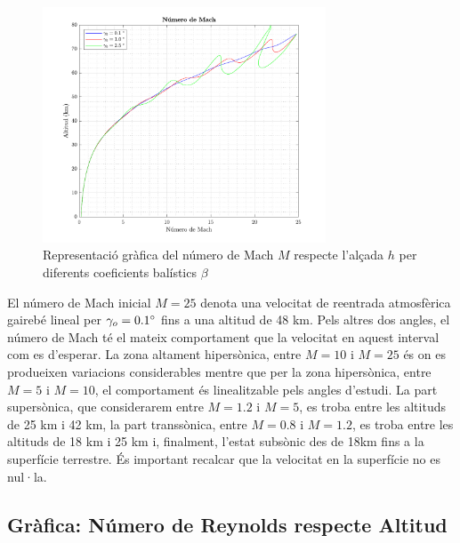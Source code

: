 \begin{figure}[ht]
    \centering
    \includegraphics[width=0.75\textwidth]{imagenes/02_lifting_graficas/mach.pdf}
    \caption{Representació gràfica del número de Mach $M$ respecte l'alçada $h$ per diferents coeficients balístics $\beta$}
    \label{fig:mach_lift}
\end{figure}

El número de Mach inicial $ M = 25$ denota una velocitat de reentrada atmosfèrica gairebé lineal per $\gamma_o = 0.1 \mathrm{^{\circ}} $ fins a una altitud de 48 km. Pels altres dos angles, el número de Mach té el mateix comportament que la velocitat en aquest interval com es d'esperar. La zona altament hipersònica, entre $M = 10$ i $M = 25$ és on es produeixen variacions considerables mentre que per la zona hipersònica, entre $M =5$ i $M= 10$, el comportament és linealitzable pels angles d'estudi.\newline
La part supersònica, que considerarem entre $M=1.2$ i $M = 5$, es troba entre les altituds de 25 km i 42 km, la part transsònica, entre $M=0.8$ i $M=1.2$, es troba entre les altituds de 18 km i 25 km i, finalment, l'estat subsònic des de 18km fins a la superfície terrestre. És important recalcar que la velocitat en la superfície no es nul·la.

\newpage
\subsection{Gràfica: Número de Reynolds respecte Altitud}

